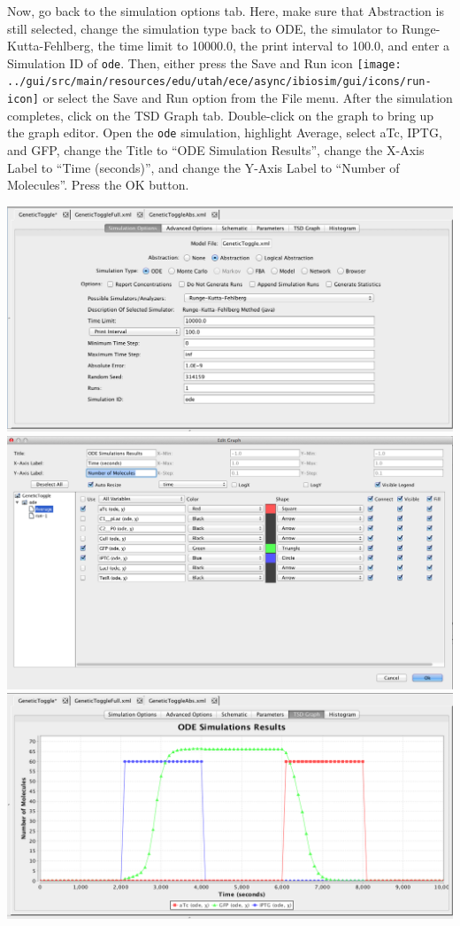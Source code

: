 \documentclass[titlepage,11pt]{article}
\begin{document}
Now, go back to the simulation options tab.  Here, make sure that Abstraction is still selected, change the simulation type back to ODE, the simulator to Runge-Kutta-Fehlberg,  the time limit to 10000.0, the print interval to 100.0, and enter a Simulation ID of {\tt ode}.  Then, either press the Save and Run icon \texttt{[image: ../gui/src/main/resources/edu/utah/ece/async/ibiosim/gui/icons/run-icon]} or select the Save and Run option from the File menu.
After the simulation completes, click on the TSD Graph tab.  Double-click on the graph to bring up the graph editor.
Open the {\tt ode} simulation, highlight Average, select aTc, IPTG, and GFP, change the Title to ``ODE Simulation Results'', change the X-Axis Label to ``Time (seconds)'', and change the Y-Axis Label to ``Number of Molecules''.  
Press the OK button.  

\begin{center}
\includegraphics[width=160mm]{screenshots/odeSimGT}\\
\includegraphics[width=160mm]{screenshots/odeResultsGT}\\
\includegraphics[width=160mm]{screenshots/odeSimResultsGT}
\end{center}
\end{document}
